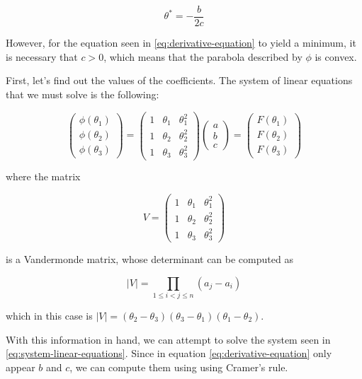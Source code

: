 \documentclass[11pt,a4paper]{article}
\begin{document}
\begin{equation}
  \label{eq:derivative-equation}
  \theta^* = -\frac{b}{2c}
\end{equation}

However, for the equation seen in \eqref{eq:derivative-equation} to yield a minimum, it is necessary
that $c > 0$, which means that the parabola described by $\phi$ is convex.

First, let's find out the values of the coefficients. The system of linear equations that we
must solve is the following:

\begin{equation}
  \label{eq:system-linear-equations}
  \begin{pmatrix}
    \phi(\theta_1) \\
    \phi(\theta_2) \\
    \phi(\theta_3)
  \end{pmatrix}
  =
  \begin{pmatrix}
    1 & \theta_1 & \theta_1^2 \\
    1 & \theta_2 & \theta_2^2 \\
    1 & \theta_3 & \theta_3^2
  \end{pmatrix}
  \begin{pmatrix}
    a \\
    b \\
    c
  \end{pmatrix}
  =
  \begin{pmatrix}
    F(\theta_1) \\
    F(\theta_2) \\
    F(\theta_3)
  \end{pmatrix}
\end{equation}

\noindent where the matrix

\[
  V =
  \begin{pmatrix}
    1 & \theta_1 & \theta_1^2 \\
    1 & \theta_2 & \theta_2^2 \\
    1 & \theta_3 & \theta_3^2
  \end{pmatrix}
\]

\noindent is a Vandermonde matrix, whose determinant can be computed as

\[
  |V| = \prod_{1 \leq i < j \leq n} (a_j - a_i)
\]

\noindent which in this case is $|V| = (\theta_2 - \theta_3)(\theta_3 - \theta_1)(\theta_1 - \theta_2)$.

With this information in hand, we can attempt to solve the system seen in \eqref{eq:system-linear-equations}.
Since in equation \eqref{eq:derivative-equation} only appear $b$ and $c$, we can compute them
using using Cramer's rule.
\end{document}
